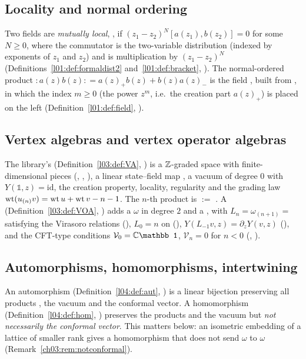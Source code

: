 \subsection{Locality and normal ordering}

Two fields are \emph{mutually local}, , if
$(z_1-z_2)^N[a(z_1),b(z_2)]=0$ for some $N\ge0$, where the commutator is the two-variable
distribution  (indexed by exponents of $z_1$ and $z_2$) and
 is multiplication by $(z_1-z_2)^N$ (Definitions~\ref{l01:def:formaldist2}
and~\ref{l01:def:bracket}, ). The normal-ordered product
${:}a(z)b(z){:}=a(z)_+b(z)+b(z)a(z)_-$ is the field , built from
, in which the index $m\ge0$ (the power $z^m$, i.e.\ the creation part
$a(z)_+$) is placed on the left (Definition~\ref{l01:def:field}, ).

\subsection{Vertex algebras and vertex operator algebras}

The library's  (Definition~\ref{l03:def:VA},
) is a ${\mathbb{Z}}$-graded space with finite-dimensional pieces
(, , ), a linear state--field map
, a vacuum of degree $0$ with $Y(\mathbb1,z)=\mathrm{id}$, the
creation property, locality, regularity and the grading law $\operatorname{wt}(u_{(n)}v)=\operatorname{wt} u+\operatorname{wt} v-n-1$. The
$n$-th product is  $:=$ . A
 (Definition~\ref{l03:def:VOA},
) adds a  $\omega$ in degree
$2$ and a , with $L_n=\omega_{(n+1)}=$ 
satisfying the Virasoro relations (), $L_0=n$ on 
(), $Y(L_{-1}v,z)=\partial_zY(v,z)$ (), and the CFT-type
conditions $\mathcal V_0=\C\mathbb1$, $\mathcal V_n=0$ for $n<0$ (,
).

\subsection{Automorphisms, homomorphisms, intertwining}

An automorphism  (Definition~\ref{l04:def:aut}, )
is a linear bijection preserving all products , the vacuum and the conformal
vector. A homomorphism  (Definition~\ref{l04:def:hom},
) preserves the products and the vacuum but \emph{not
necessarily the conformal vector}. This matters below: an isometric embedding of a lattice of
smaller rank gives a homomorphism that does not send $\omega$ to $\omega$
(Remark~\ref{ch03:rem:notconformal}).

